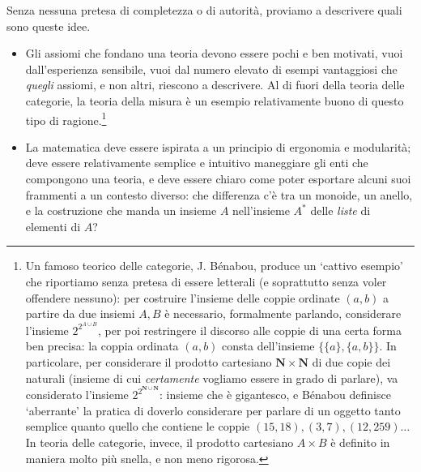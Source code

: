 \medskip
Senza nessuna pretesa di completezza o di autorità, proviamo a descrivere quali sono queste idee.
\begin{itemize}
 \item Gli assiomi che fondano una teoria devono essere pochi e ben motivati, vuoi dall'esperienza sensibile, vuoi dal numero elevato di esempi vantaggiosi che \emph{quegli} assiomi, e non altri, riescono a descrivere. Al di fuori della teoria delle categorie, la teoria della misura è un esempio relativamente buono di questo tipo di ragione.\footnote{Un famoso teorico delle categorie, J. Bénabou, produce un `cattivo esempio' che riportiamo senza pretesa di essere letterali (e soprattutto senza voler offendere nessuno): per costruire l'insieme delle coppie ordinate \((a,b)\) a partire da due insiemi \(A,B\) è necessario, formalmente parlando, considerare l'insieme \(2^{2^{A\cup B}}\), per poi restringere il discorso alle coppie di una certa forma ben precisa: la coppia ordinata \((a,b)\) consta dell'insieme \(\{\{a\},\{a,b\}\}\). In particolare, per considerare il prodotto cartesiano \(\mathbf{N} \times \mathbf{N}\) di due copie dei naturali (insieme di cui \emph{certamente} vogliamo essere in grado di parlare), va considerato l'insieme \(2^{2^{\mathbf{N} \cup \mathbf{N}}}\): insieme che è gigantesco, e Bénabou definisce `aberrante' la pratica di doverlo considerare per parlare di un oggetto tanto semplice quanto quello che contiene le coppie \((15,18), (3,7), (12, 259)\dots\) In teoria delle categorie, invece, il prodotto cartesiano \(A\times B\) è definito in maniera molto più snella, e non meno rigorosa.}
 \item La matematica deve essere ispirata a un principio di ergonomia e modularità; deve essere relativamente semplice e intuitivo maneggiare gli enti che compongono una teoria, e deve essere chiaro come poter esportare alcuni suoi frammenti a un contesto diverso: che differenza c'è tra un monoide, un anello, e la costruzione che manda un insieme $A$ nell'insieme $A^*$ delle \emph{liste} di elementi di $A$? 
 

\end{itemize}
